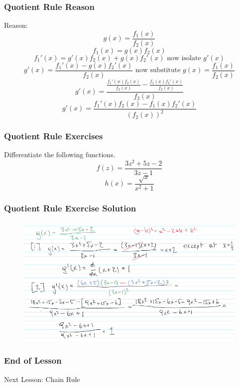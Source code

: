 \documentclass[xcolor=dvipsnames]{beamer}
\begin{document}
\begin{frame}
  \frametitle{Quotient Rule Reason}
Reason:
\begin{equation}
  \label{eq:iebowohc}
g(x)=\frac{f_{1}(x)}{f_{2}(x)}
\end{equation}
\begin{equation}
  \label{eq:iilahthi}
f_{1}(x)=g(x)f_{2}(x)
\end{equation}
\begin{equation}
  \label{eq:eshohhoo}
f_{1}'(x)=g'(x)f_{2}(x)+g(x)f_{2}'(x)\mbox{ now isolate }g'(x)
\end{equation}
\begin{equation}
  \label{eq:iophiewu}
g'(x)=\frac{f_{1}'(x)-g(x)f_{2}'(x)}{f_{2}(x)}\mbox{ now substitute }g(x)=\frac{f_{1}(x)}{f_{2}(x)}
\end{equation}
\begin{equation}
  \label{eq:uhushain}
g'(x)=\frac{\frac{f_{1}'(x)f_{2}(x)}{f_{2}(x)}-\frac{f_{1}(x)f_{2}'(x)}{f_{2}(x)}}{f_{2}(x)}
\end{equation}
\begin{equation}
  \label{eq:requuare}
g'(x)=\frac{f_{1}'(x)f_{2}(x)-f_{1}(x)f_{2}'(x)}{\left(f_{2}(x)\right)^{2}}
\end{equation}
\end{frame}

\begin{frame}
  \frametitle{Quotient Rule Exercises}
Differentiate the following functions.
\begin{equation}
  \label{eq:xookaeji}
f(z)=\frac{3z^{2}+5z-2}{3z-1}
\end{equation}
\begin{equation}
  \label{eq:eidoogow}
h(x)=\frac{\sqrt{x}}{x^{2}+1}
\end{equation}
\end{frame}

\begin{frame}
  \frametitle{Quotient Rule Exercise Solution}
  \begin{figure}[h]
    \includegraphics[scale=0.575]{./diagrams/onenote_ft_09_ProductQuotientRule_02.png}
  \end{figure}
\end{frame}

\begin{frame}
  \frametitle{End of Lesson}
Next Lesson: Chain Rule
\end{frame}
\end{document}
